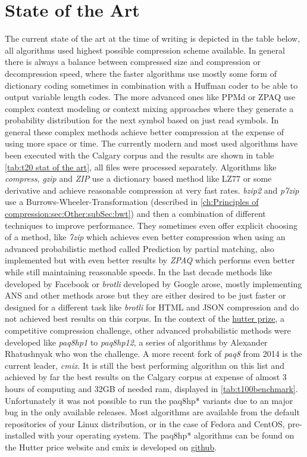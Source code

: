 \section{State of the Art}
\label{ch:Principles of compression:sec:SOTA}
\par{
The current state of the art at the time of writing is depicted in the table below, all algorithms used highest possible compression scheme available. In general there is always a balance between compressed size and compression or decompression speed, where the faster algorithms use mostly some form of dictionary coding sometimes in combination with a Huffman coder to be able to output variable length codes. The more advanced ones like PPMd or ZPAQ use complex context modeling or context mixing approaches where they generate a probability distribution for the next symbol based on just read symbols. In general these complex methods achieve better compression at the expense of using more space or time. The currently modern and most used algorithms have been executed with the Calgary corpus and the results are shown in table \ref{tab:t20 stat of the art}, all files were processed separately. Algorithms like \textit{compress}, \textit{gzip} and \textit{ZIP} use a dictionary based method like LZ77 or some derivative and achieve reasonable compression at very fast rates. \textit{bzip2} and \textit{p7zip} use a Burrows-Wheeler-Transformation (described in \ref{ch:Principles of compression:sec:Other:subSec:bwt}) and then a combination of different techniques to improve performance. They sometimes even offer explicit choosing of a method, like \textit{7zip} which achieves even better compression when using an advanced probabilistic method called Prediction by partial matching, also implemented but with even better results by \textit{ZPAQ} which performs even better while still maintaining reasonable speeds. In the last decade methods like  developed by Facebook or \textit{brotli} developed by Google arose, mostly implementing ANS and other methods arose but they are either desired to be just faster or designed for a different task like \textit{brotli} for HTML and JSON compression and do not achieved best results on this corpus. In the context of the \href{http://prize.hutter1.net/}{hutter prize}, a competitive compression challenge, other advanced probabilistic methods were developed like \textit{paq8hp1} to \textit{paq8hp12}, a series of algorithms by Alexander Rhatushnyak \cite{mahoney2011large} who won the challenge. A more recent fork of \textit{paq8} from 2014 is the current leader, \textit{cmix}. It is still the best performing algorithm on this list and achieved by far the best results on the Calgary corpus at expense of almost 3 hours of computing and 32GB of needed ram, displayed in \ref{tab:t100benchmark}. Unfortunately it was not possible to run the paq8hp* variants due to an major bug in the only available releases. Most algorithms are available from the default repositories of your Linux distribution, or in the case of Fedora and CentOS, pre-installed with your operating system. The paq8hp* algorithms can be found on the Hutter price website and cmix is developed on \href{https://github.com/byronknoll/cmix}{github}.
}
